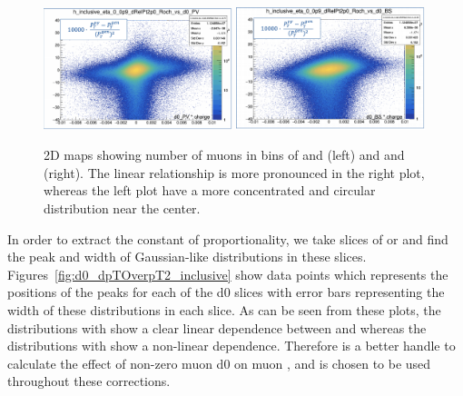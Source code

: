 \begin{figure}[h!]
    \centering
    \includegraphics[width=0.49\textwidth]{images_geofit/2D_d0_PV_dpTOverpT2.png}
    \includegraphics[width=0.49\textwidth]{images_geofit/2D_d0_BS_dpTOverpT2.png}
    \caption{2D maps showing number of muons in bins of \dptoverptsquare and \dzeroPV (left) and \dptoverptsquare and \dzeroBS (right). The linear relationship is more pronounced in the right plot, whereas the left plot have a more concentrated and circular distribution near the center.}
    \label{fig:2D_d0_dpTOverpT2_inclusive}
\end{figure}

In order to extract the constant of proportionality, we take slices of \dzeroPV or \dzeroBS and find the peak and width of Gaussian-like \dptoverptsquare distributions in these slices. Figures~\ref{fig:d0_dpTOverpT2_inclusive} show data points which represents the positions of the peaks for each of the d0 slices with error bars representing the width of these distributions in each slice. As can be seen from these plots, the distributions with \dzeroBS show a clear linear dependence between \dptoverptsquare and \dzeroBS whereas the distributions with \dzeroPV show a non-linear dependence. Therefore \dzeroBS is a better handle to calculate the effect of non-zero muon d0 on muon \pt, and is chosen to be used throughout these corrections.

